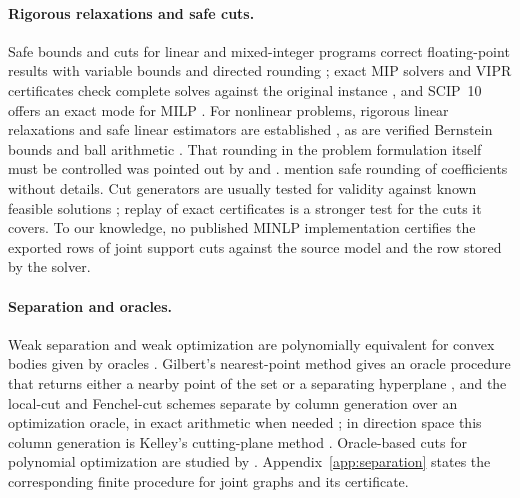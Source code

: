 \paragraph{Rigorous relaxations and safe cuts.}
Safe bounds and cuts for linear and mixed-integer programs correct
floating-point results with variable bounds and directed rounding
\citep{NeumaierShcherbina2004,CookEtAl2009SafeCuts,EiflerGleixner2024}; exact
MIP solvers and VIPR certificates check complete solves against the original
instance \citep{CookKochSteffyWolter2013,CheungGleixnerSteffy2017,EiflerGleixner2023},
and SCIP~10 offers an exact mode for MILP \citep{SCIP10}. For nonlinear
problems, rigorous linear relaxations and safe linear estimators are
established \citep{BorradaileVanHentenryck2005,Kearfott2011,DomesNeumaier2012,NininMessineHansen2015},
as are verified Bernstein bounds
\citep{GarloffJanssonSmith2003JCAM,GarloffSmith2008,MunozNarkawicz2013} and
ball arithmetic \citep{Johansson2017arb}. That rounding in the problem
formulation itself must be controlled was pointed out by
\citet[Section~20]{Neumaier2004} and \citet{SchichlNeumaier2005}.
\citet{LiersEtAl2021} mention safe rounding of coefficients without details.
Cut generators are usually tested for validity against known feasible
solutions \citep{Margot2009}; replay of exact certificates is a stronger test
for the cuts it covers. To our knowledge, no published MINLP implementation
certifies the exported rows of joint support cuts against the source model
and the row stored by the solver.

\paragraph{Separation and oracles.}
Weak separation and weak optimization are polynomially equivalent for convex
bodies given by oracles \citep{GrotschelLovaszSchrijver1981,GrotschelLovaszSchrijver1988}.
Gilbert's nearest-point method gives an oracle procedure that returns either
a nearby point of the set or a separating hyperplane
\citep{Gilbert1966,BrierleyNavascuesVertesi2016}, and the local-cut and
Fenchel-cut schemes separate by column generation over an optimization
oracle, in exact arithmetic when needed \citep{Boyd1994,ChvatalCookEspinoza2013};
in direction space this column generation is Kelley's cutting-plane method
\citep{CheneyGoldstein1959,Kelley1960}. Oracle-based cuts for polynomial
optimization are studied by \citet{BienstockChenMunoz2020}.
Appendix~\ref{app:separation} states the corresponding finite procedure for
joint graphs and its certificate.


